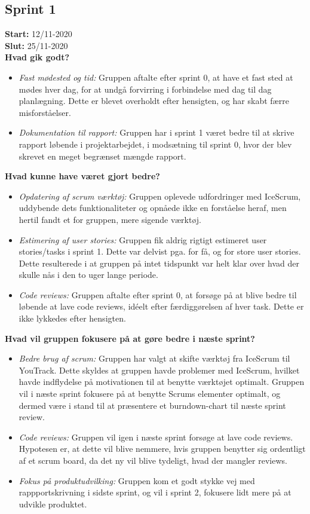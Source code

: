 \subsection{Sprint 1}

\textbf{Start:} 12/11-2020 \\
\textbf{Slut:} 25/11-2020 \\

\textbf{Hvad gik godt?}
\begin{itemize}
    \item \textit{Fast mødested og tid:} Gruppen aftalte efter sprint 0, at have et fast sted at mødes hver dag, for at undgå 
    forvirring i forbindelse med dag til dag planlægning. Dette er blevet overholdt efter hensigten, og har skabt færre misforståelser. 
    \item \textit{Dokumentation til rapport:} Gruppen har i sprint 1 været bedre til at skrive rapport løbende i projektarbejdet, 
    i modsætning til sprint 0, hvor der blev skrevet en meget begrænset mængde rapport. 
\end{itemize}

\textbf{Hvad kunne have været gjort bedre?}
\begin{itemize}
    \item \textit{Opdatering af scrum værktøj:} Gruppen oplevede udfordringer med IceScrum, uddybende dets funktionaliteter 
    og opnåede ikke en forståelse heraf, men hertil fandt et for gruppen, mere sigende værktøj.  
    \item \textit{Estimering af user stories:} Gruppen fik aldrig rigtigt estimeret user stories/tasks i sprint 1. Dette var delvist pga. 
    for få, og for store user stories. Dette resulterede i at gruppen på intet tidspunkt var helt klar over hvad der skulle nås i den to uger lange periode. 
    \item \textit{Code reviews:} Gruppen aftalte efter sprint 0, at forsøge på at blive bedre til løbende at lave code reviews, idéelt efter færdiggørelsen
    af hver task. Dette er ikke lykkedes efter hensigten.
\end{itemize}

\textbf{Hvad vil gruppen fokusere på at gøre bedre i næste sprint?}
\begin{itemize}
    \item \textit{Bedre brug af scrum:} Gruppen har valgt at skifte værktøj fra IceScrum til YouTrack. Dette skyldes at gruppen havde problemer med IceScrum, hvilket
    havde indflydelse på motivationen til at benytte værktøjet optimalt. Gruppen vil i næste sprint fokusere på at benytte Scrums elementer optimalt, og dermed være i stand
    til at præsentere et burndown-chart til næste sprint review.
    \item \textit{Code reviews:} Gruppen vil igen i næste sprint forsøge at lave code reviews. Hypotesen er, at dette vil blive nemmere, hvis gruppen benytter sig ordentligt 
    af et scrum board, da det ny vil blive tydeligt, hvad der mangler reviews.
    \item \textit{Fokus på produktudvilking:} Gruppen kom et godt stykke vej med rappportskrivning i sidste sprint, og vil i sprint 2, fokusere lidt mere på at udvikle produktet.
\end{itemize}